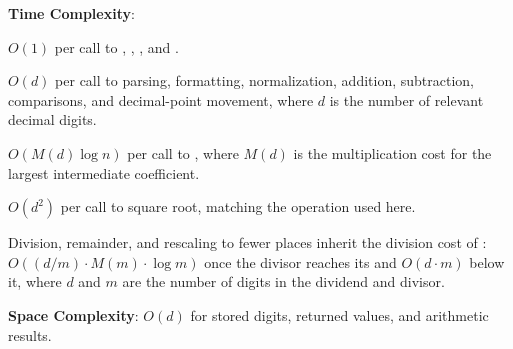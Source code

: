 \textbf{Time Complexity}:
\begin{compactitem}
  \item $O(1)$ per call to , , , and .
  \item $O(d)$ per call to parsing, formatting, normalization, addition, subtraction, comparisons, and decimal-point movement, where $d$ is the number of relevant decimal digits.
  \item $O(M(d) \log n)$ per call to , where $M(d)$ is the multiplication cost for the largest intermediate coefficient.
  \item $O(d^{2})$ per call to square root, matching the  operation used here.
  \item Division, remainder, and rescaling to fewer places inherit the  division cost of : $O((d/m) \cdot M(m) \cdot \log m)$ once the divisor reaches its  and $O(d \cdot m)$ below it, where $d$ and $m$ are the number of digits in the dividend and divisor.
\end{compactitem}

\textbf{Space Complexity}: $O(d)$ for stored digits, returned values, and arithmetic results.

